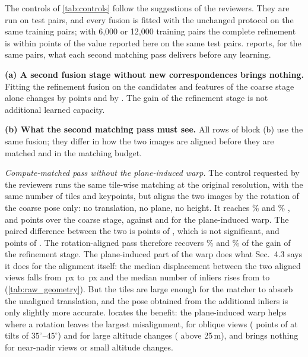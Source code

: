 



The controls of \cref{tab:controls} follow the suggestions of the reviewers. They are run on \ctN{} test pairs, and every fusion is fitted with the unchanged protocol on the same \ctTrainRows{} training pairs; with 6{,}000 or 12{,}000 training pairs the complete refinement is within \ctTrainSizeGap{} points of the value reported here on the same test pairs.  reports, for the same pairs, what each second matching pass delivers before any learning.

\noindent\textbf{(a) A second fusion stage without new correspondences brings nothing.} Fitting the refinement fusion on the candidates and features of the coarse stage alone changes \SRd{} by \ctFusionOnlydSRd{} points and \SRe{} by \ctFusionOnlydSRe{}. The gain of the refinement stage is not additional learned capacity.

\noindent\textbf{(b) What the second matching pass must see.} All rows of block (b) use the same fusion; they differ in how the two images are aligned before they are matched and in the matching budget.

\emph{Compute-matched pass without the plane-induced warp.} The control requested by the reviewers runs the same tile-wise matching at the original resolution, with the same number of tiles and keypoints, but aligns the two images by the rotation of the coarse pose only: no translation, no plane, no height. It reaches \ctRotSRd\% \SRd{} and \ctRotSRe\% \SRe, \ie \ctRotdSRd{} and \ctRotdSRe{} points over the coarse stage, against \ctFulldSRd{} and \ctFulldSRe{} for the plane-induced warp. The paired difference between the two is \ctRotVsFullSRd{} points of \SRd{} \ci{\ctRotVsFullSRdLo}{\ctRotVsFullSRdHi}, which is not significant, and \ctRotVsFullSRe{} points of \SRe{} \ci{\ctRotVsFullSReLo}{\ctRotVsFullSReHi}. The rotation-aligned pass therefore recovers \ctRotShareD\% and \ctRotShareE\% of the gain of the refinement stage. The plane-induced part of the warp does what Sec.~4.3 says it does for the alignment itself: the median displacement between the two aligned views falls from \rgRotRes\,px to \rgOursRes\,px and the median number of inliers rises from \rgRotInl{} to \rgOursInl{} (\cref{tab:raw_geometry}). But the tiles are large enough for the matcher to absorb the unaligned translation, and the pose obtained from the additional inliers is only slightly more accurate.  locates the benefit: the plane-induced warp helps where a rotation leaves the largest misalignment, for oblique views (\prTiltHi{} points of \SRe{} \ci{\prTiltHiLo}{\prTiltHiHi} at tilts of $35^\circ$--$45^\circ$) and for large altitude changes (\prDzHi{} \ci{\prDzHiLo}{\prDzHiHi} above 25\,m), and brings nothing for near-nadir views or small altitude changes.

